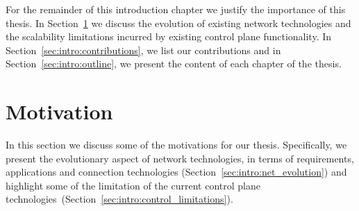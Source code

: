 

% 

For the remainder of this introduction chapter we justify the importance of this
thesis.  In Section~\ref{sec:intro:motivations} we discuss the evolution of
existing network technologies and the scalability limitations incurred by
existing control plane functionality. In Section~\ref{sec:intro:contributions},
we list our contributions and in Section~\ref{sec:intro:outline}, we present the
content of each chapter of the thesis.

\section{Motivation} \label{sec:intro:motivations}

In this section we discuss some of the motivations for our thesis. Specifically,
we present the evolutionary aspect of network technologies, in terms of
requirements, applications and connection technologies
(Section~\ref{sec:intro:net_evolution}) and highlight some of the limitation of
the current control plane
technologies~(Section~\ref{sec:intro:control_limitations}).

